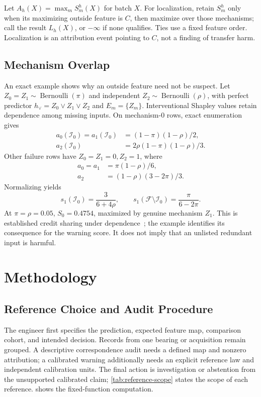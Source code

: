 \documentclass[conference]{IEEEtran}
\begin{document}
Let $A_h(X)=\max_m S_m^h(X)$ for batch $X$. For localization, retain $S_m^h$ only when its maximizing outside feature is $C$, then maximize over those mechanisms; call the result $L_h(X)$, or $-\infty$ if none qualifies. Ties use a fixed feature order. Localization is an attribution event pointing to $C$, not a finding of transfer harm.

\subsection{Mechanism Overlap}
An exact example shows why an outside feature need not be suspect. Let $Z_0=Z_1\sim\operatorname{Bernoulli}(\pi)$ and independent $Z_2\sim\operatorname{Bernoulli}(\rho)$, with perfect predictor $h_\lor=Z_0\lor Z_1\lor Z_2$ and $E_m=\{Z_m\}$. Interventional Shapley values retain dependence among missing inputs. On mechanism-0 rows, exact enumeration gives
\begin{align}
 a_0(\mathcal I_0)=a_1(\mathcal I_0)&=(1-\pi)(1-\rho)/2,\\
 a_2(\mathcal I_0)&=2\rho(1-\pi)(1-\rho)/3.
\end{align}
Other failure rows have $Z_0=Z_1=0,Z_2=1$, where
\begin{align}
 a_0=a_1&=\pi(1-\rho)/6,\\
 a_2&=(1-\rho)(3-2\pi)/3.
\end{align}
Normalizing yields
\begin{equation}
 s_1(\mathcal I_0)=\frac{3}{6+4\rho},\qquad
 s_1(\mathcal F\setminus\mathcal I_0)=\frac{\pi}{6-2\pi}.
\end{equation}
At $\pi=\rho=0.05$, $S_0=0.4754$, maximized by genuine mechanism $Z_1$. This is established credit sharing under dependence~\cite{janzing2020feature,kumar2020problems}; the example identifies its consequence for the warning score. It does not imply that an unlisted redundant input is harmful.

\section{Methodology}
\label{sec:method}
\subsection{Reference Choice and Audit Procedure}
The engineer first specifies the prediction, expected feature map, comparison cohort, and intended decision. Records from one bearing or acquisition remain grouped. A descriptive correspondence audit needs a defined map and nonzero attribution; a calibrated warning additionally needs an explicit reference law and independent calibration units. The final action is investigation or abstention from the unsupported calibrated claim; \cref{tab:reference-scope} states the scope of each reference.  shows the fixed-function computation.
\end{document}
